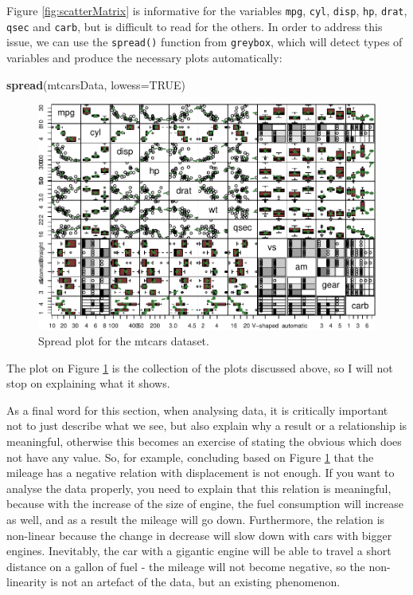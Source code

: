 \documentclass[
]{book}
\newenvironment{Shaded}{\begin{snugshade}}{\end{snugshade}}
\newcommand{\DataTypeTok}[1]{\textcolor[rgb]{0.13,0.29,0.53}{#1}}
\newcommand{\KeywordTok}[1]{\textcolor[rgb]{0.13,0.29,0.53}{\textbf{#1}}}
\newcommand{\NormalTok}[1]{#1}
\newcommand{\OtherTok}[1]{\textcolor[rgb]{0.56,0.35,0.01}{#1}}
\theoremstyle{definition}
\theoremstyle{definition}
\theoremstyle{definition}
\theoremstyle{definition}
\theoremstyle{remark}
\begin{document}
Figure \ref{fig:scatterMatrix} is informative for the variables \texttt{mpg}, \texttt{cyl}, \texttt{disp}, \texttt{hp}, \texttt{drat}, \texttt{qsec} and \texttt{carb}, but is difficult to read for the others. In order to address this issue, we can use the \texttt{spread()} function from \texttt{greybox}, which will detect types of variables and produce the necessary plots automatically:

\begin{Shaded}
\begin{Highlighting}[]
\KeywordTok{spread}\NormalTok{(mtcarsData, }\DataTypeTok{lowess=}\OtherTok{TRUE}\NormalTok{)}
\end{Highlighting}
\end{Shaded}

\begin{figure}
\centering
\includegraphics{Svetunkov---Statistics-for-Business-Analytics_files/figure-latex/spreadPlot-1.pdf}
\caption{\label{fig:spreadPlot}Spread plot for the mtcars dataset.}
\end{figure}

The plot on Figure \ref{fig:spreadPlot} is the collection of the plots discussed above, so I will not stop on explaining what it shows.

As a final word for this section, when analysing data, it is critically important not to just describe what we see, but also explain why a result or a relationship is meaningful, otherwise this becomes an exercise of stating the obvious which does not have any value. So, for example, concluding based on Figure \ref{fig:spreadPlot} that the mileage has a negative relation with displacement is not enough. If you want to analyse the data properly, you need to explain that this relation is meaningful, because with the increase of the size of engine, the fuel consumption will increase as well, and as a result the mileage will go down. Furthermore, the relation is non-linear because the change in decrease will slow down with cars with bigger engines. Inevitably, the car with a gigantic engine will be able to travel a short distance on a gallon of fuel - the mileage will not become negative, so the non-linearity is not an artefact of the data, but an existing phenomenon.
\end{document}
